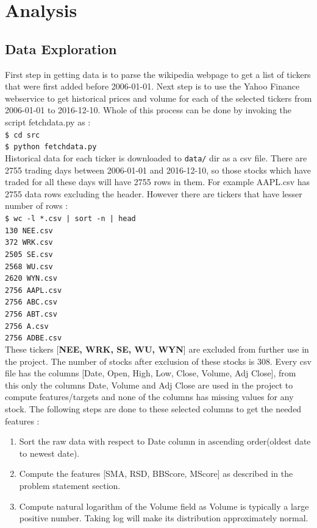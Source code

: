 \documentclass[10pt]{report}
\begin{document}
\section{Analysis}
\subsection*{Data Exploration}
First step in getting data is to parse the wikipedia webpage\cite{sp500} to get a list of tickers that were first added before 2006-01-01. Next step is to use the Yahoo Finance webservice to get historical prices and volume for each of the selected tickers from 2006-01-01 to 2016-12-10. Whole of this process can be done by invoking the script fetchdata.py as :\\
\texttt{\$ cd src\\
\$ python fetchdata.py}\\
Historical data for each ticker is downloaded to \texttt{data/} dir as a csv file. There are 2755 trading days between 2006-01-01 and 2016-12-10, so those stocks which have traded for all these days will have 2755 rows in them. For example AAPL.csv has 2755 data rows excluding the header. However there are tickers that have lesser number of rows :\\
\texttt{\$ wc -l *.csv | sort -n  | head\\
     130 NEE.csv\\
     372 WRK.csv\\
    2505 SE.csv\\
    2568 WU.csv\\
    2620 WYN.csv\\
    2756 AAPL.csv\\
    2756 ABC.csv\\
    2756 ABT.csv\\
    2756 A.csv\\
    2756 ADBE.csv}\\
These tickers [\textbf{NEE, WRK, SE, WU, WYN}] are excluded from further use in the project. The number of stocks after exclusion of these stocks is 308.
Every csv file has the columns [Date, Open, High, Low, Close, Volume, Adj Close], from this only the columns Date, Volume and Adj Close are used in the project to compute features/targets and none of the columns has missing values for any stock.
The following steps are done to these selected columns to get the needed features :
\begin{enumerate}
\item Sort the raw data with respect to Date column in ascending order(oldest date to newest date).
\item Compute the features [SMA, RSD, BBScore, MScore] as described in the problem statement section.
\item Compute natural logarithm of the Volume field as Volume is typically a large positive number. Taking log will make its distribution approximately normal.
\end{enumerate}
\end{document}
